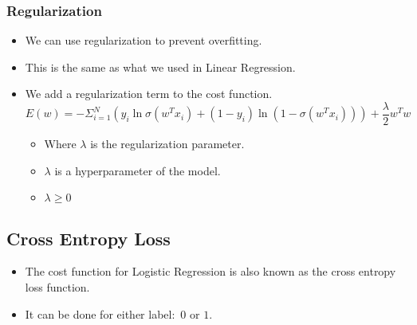 \documentclass[12pt]{article}
\begin{document}
            \subsubsection{Regularization}
                \begin{itemize}
                    \item We can use regularization to prevent overfitting.
                    \item This is the same as what we used in Linear Regression.
                    \item We add a regularization term to the cost function.
                    \begin{equation}
                        E(w) = -\Sigma_{i=1}^N(y_i\ln\sigma({w^T}x_i) + (1 - y_i)\ln(1 - \sigma({w^T}x_i))) + \frac{\lambda}{2}{w^T}w
                    \end{equation}
                    \begin{itemize}
                        \item Where $\lambda$ is the regularization parameter.
                        \item $\lambda$ is a hyperparameter of the model.
                        \item $\lambda \geq 0$
                    \end{itemize}
                \end{itemize}
        \subsection{Cross Entropy Loss}
            \begin{itemize}
                \item The cost function for Logistic Regression is also known as the cross entropy loss function.
                \item It can be done for either label:\ $0$ or $1$.
            \end{itemize}
\end{document}
